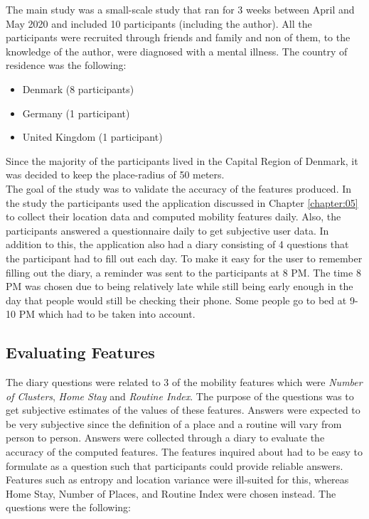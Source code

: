 The main study was a small-scale study that ran for 3 weeks between April and May 2020 and included 10 participants (including the author). All the participants were recruited through friends and family and non of them, to the knowledge of the author, were diagnosed with a mental illness. The country of residence was the following:

\begin{itemize}
    \item Denmark (8 participants)
    \item Germany (1 participant)
    \item United Kingdom (1 participant)
\end{itemize}

Since the majority of the participants lived in the Capital Region of Denmark, it was decided to keep the place-radius of 50 meters.\\

The goal of the study was to validate the accuracy of the features produced. In the study the participants used the application discussed in Chapter \ref{chapter:05} to collect their location data and computed mobility features daily. Also, the participants answered a questionnaire daily to get subjective user data. In addition to this, the application also had a diary consisting of 4 questions that the participant had to fill out each day. To make it easy for the user to remember filling out the diary, a reminder was sent to the participants at 8 PM. The time 8 PM was chosen due to being relatively late while still being early enough in the day that people would still be checking their phone. Some people go to bed at 9-10 PM which had to be taken into account.\\


\subsection{Evaluating Features}
The diary questions were related to 3 of the mobility features which were \textit{Number of Clusters}, \textit{Home Stay} and \textit{Routine Index}. The purpose of the questions was to get subjective estimates of the values of these features. Answers were expected to be very subjective since the definition of a place and a routine will vary from person to person. Answers were collected through a diary to evaluate the accuracy of the computed features. The features inquired about had to be easy to formulate as a question such that participants could provide reliable answers. Features such as entropy and location variance were ill-suited for this, whereas Home Stay, Number of Places, and Routine Index were chosen instead. The questions were the following:

